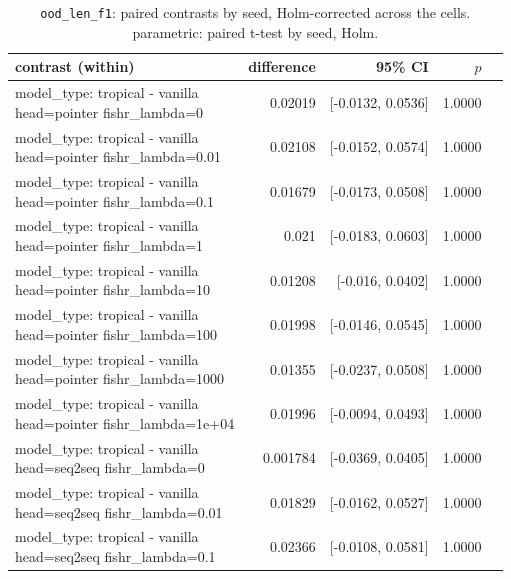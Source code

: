 \documentclass[10pt]{article}
\makeatletter
\newcommand{\stackcell}[1]{\begin{tabular}[t]{@{}l@{}}#1\end{tabular}}
\makeatother
\begin{document}
{\small
\begin{longtable}{lrrrl}
\caption{\texttt{ood\_len\_f1}: paired contrasts by seed, Holm-corrected across the cells. parametric: paired t-test by seed, Holm.}\label{tab:paired-ood_len_f1}\\
\toprule
contrast (within) & difference & 95\% CI & $p$ & \\
\midrule
\endhead
\stackcell{model\_type: tropical - vanilla\\\footnotesize head=pointer fishr\_lambda=0 } & 0.02019 & [-0.0132, 0.0536] & 1.0000 & \\
\stackcell{model\_type: tropical - vanilla\\\footnotesize head=pointer fishr\_lambda=0.01 } & 0.02108 & [-0.0152, 0.0574] & 1.0000 & \\
\stackcell{model\_type: tropical - vanilla\\\footnotesize head=pointer fishr\_lambda=0.1 } & 0.01679 & [-0.0173, 0.0508] & 1.0000 & \\
\stackcell{model\_type: tropical - vanilla\\\footnotesize head=pointer fishr\_lambda=1 } & 0.021 & [-0.0183, 0.0603] & 1.0000 & \\
\stackcell{model\_type: tropical - vanilla\\\footnotesize head=pointer fishr\_lambda=10 } & 0.01208 & [-0.016, 0.0402] & 1.0000 & \\
\stackcell{model\_type: tropical - vanilla\\\footnotesize head=pointer fishr\_lambda=100 } & 0.01998 & [-0.0146, 0.0545] & 1.0000 & \\
\stackcell{model\_type: tropical - vanilla\\\footnotesize head=pointer fishr\_lambda=1000 } & 0.01355 & [-0.0237, 0.0508] & 1.0000 & \\
\stackcell{model\_type: tropical - vanilla\\\footnotesize head=pointer fishr\_lambda=1e+04 } & 0.01996 & [-0.0094, 0.0493] & 1.0000 & \\
\stackcell{model\_type: tropical - vanilla\\\footnotesize head=seq2seq fishr\_lambda=0 } & 0.001784 & [-0.0369, 0.0405] & 1.0000 & \\
\stackcell{model\_type: tropical - vanilla\\\footnotesize head=seq2seq fishr\_lambda=0.01 } & 0.01829 & [-0.0162, 0.0527] & 1.0000 & \\
\stackcell{model\_type: tropical - vanilla\\\footnotesize head=seq2seq fishr\_lambda=0.1 } & 0.02366 & [-0.0108, 0.0581] & 1.0000 & \\

\end{longtable}}
\end{document}
